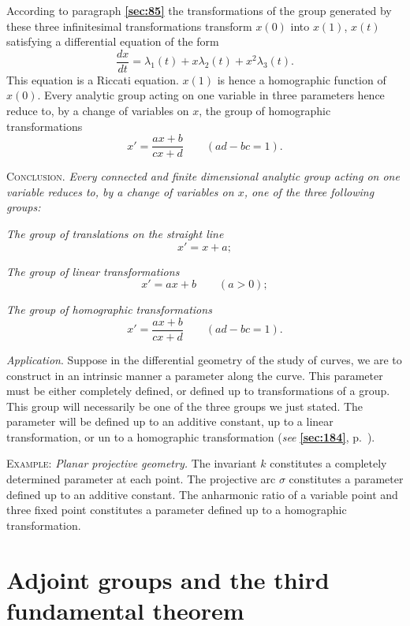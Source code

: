 \documentclass[leqno,11pt]{book}
\numberwithin{equation}{chapter}
\theoremstyle{shape1}
\theoremstyle{shapesmall}
\newcommand{\fsref}[1]{{\rm\textsection\textbf{\ref{sec:#1}}}}
\newcommand{\somespace}{\vspace{9pt}}
\begin{document}
According to paragraph \fsref{85} the transformations of the group generated by these three infinitesimal transformations transform $x(0)$ into $x(1)$, $x(t)$ satisfying a differential equation of the form
\[
\frac{dx}{dt}=\lambda_{1}(t)+x\lambda_{2}(t)+x^{2}\lambda_{3}(t).
\]
This equation is a Riccati equation. $x(1)$ is hence a homographic function of $x(0)$. Every analytic group acting on one variable in three parameters hence reduce to, by a change of variables on $x$, the group of homographic transformations
\[
x'=\frac{ax+b}{cx+d}\qquad(ad-bc=1).
\]

\somespace

\textsc{Conclusion}. \emph{Every connected and finite dimensional analytic group acting on one variable reduces to, by a change of variables on $x$, one of the three following groups:}

\somespace

\emph{The group of translations on the straight line}
\[
x'=x+a;
\]

\emph{The group of linear transformations}
\[
x'=ax+b\qquad(a>0);
\]

\emph{The group of homographic transformations}
\[
x'=\frac{ax+b}{cx+d}\qquad(ad-bc=1).
\]

\somespace

\emph{Application}. Suppose in the differential geometry of the study of curves, we are to construct in an intrinsic manner a parameter along the curve. This parameter must be either completely defined, or defined up to transformations of a group. This group will necessarily be one of the three groups we just stated. The parameter will be defined up to an additive constant, up to a linear transformation, or un to a homographic transformation (\emph{see} \fsref{184}, p.~\pageref{sec:184}).

\somespace

{\small
\textsc{Example:} \emph{Planar projective geometry.} The invariant $k$ constitutes a completely determined parameter at each point. The projective arc $\sigma$ constitutes a parameter defined up to an additive constant. The anharmonic ratio of a variable point and three fixed point constitutes a parameter defined up to a homographic transformation.
} 

\section{Adjoint groups and the third fundamental theorem}
\label{sec:adjoint-groups-third}
\end{document}
